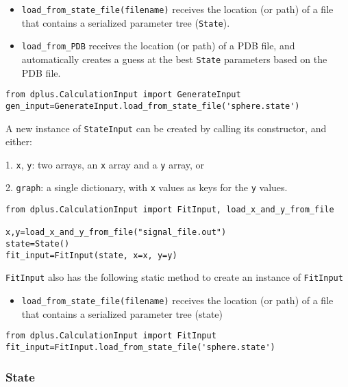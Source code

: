 \documentclass[../D+Manual.tex]{subfiles}
\begin{document}
\begin{itemize}
	\tightlist
	\item
	\texttt{load\_from\_state\_file(filename)} receives the location (or path) of a file that contains a serialized parameter tree (\texttt{State}).
	\item
	\texttt{load\_from\_PDB} receives the location (or path) of a PDB file, and
	automatically creates a guess at the best \texttt{State} parameters based on the PDB file.
\end{itemize}


\begin{lstlisting}[style=pythonstyle]
from dplus.CalculationInput import GenerateInput
gen_input=GenerateInput.load_from_state_file('sphere.state')
\end{lstlisting}

A new instance of \texttt{StateInput} can be created by calling its constructor, and either:

1. \texttt{x}, \texttt{y}: two arrays, an \texttt{x} array and a \texttt{y} array, or

2. \texttt{graph}: a single dictionary, with \texttt{x} values as keys for the \texttt{y} values.


\begin{lstlisting}[style=pythonstyle]
from dplus.CalculationInput import FitInput, load_x_and_y_from_file

x,y=load_x_and_y_from_file("signal_file.out")
state=State()
fit_input=FitInput(state, x=x, y=y)
\end{lstlisting}

\texttt{FitInput} also has the following static method to create an instance of \texttt{FitInput} 

\begin{itemize}
	\item \texttt{load\_from\_state\_file(filename)} receives the location (or path) of a file that contains a serialized parameter tree (state)
\end{itemize}

\begin{lstlisting}[style=pythonstyle]
from dplus.CalculationInput import FitInput
fit_input=FitInput.load_from_state_file('sphere.state')
\end{lstlisting}

\subsubsection{State}\label{state}
\end{document}
